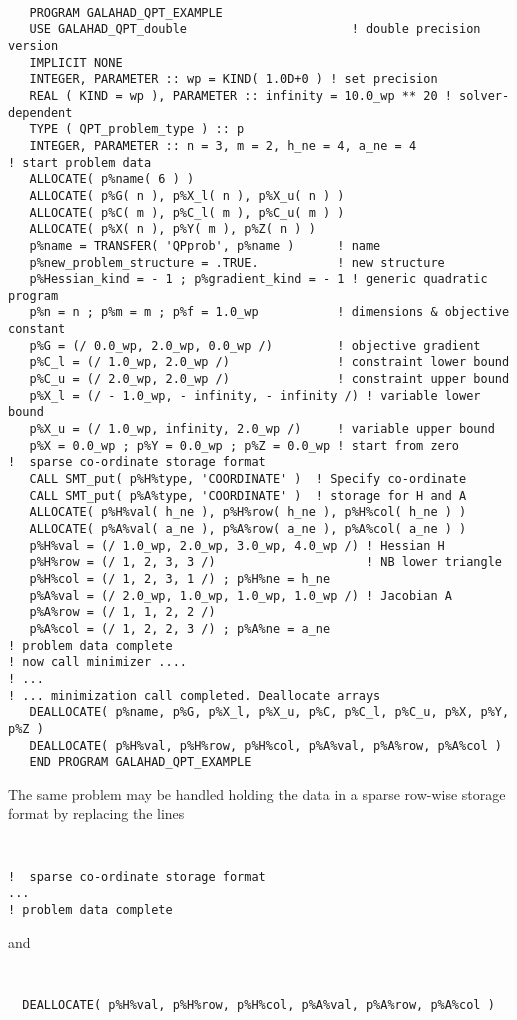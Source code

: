\documentclass{galahad}
\begin{document}
{\tt \small
\begin{verbatim}
   PROGRAM GALAHAD_QPT_EXAMPLE
   USE GALAHAD_QPT_double                       ! double precision version
   IMPLICIT NONE
   INTEGER, PARAMETER :: wp = KIND( 1.0D+0 ) ! set precision
   REAL ( KIND = wp ), PARAMETER :: infinity = 10.0_wp ** 20 ! solver-dependent
   TYPE ( QPT_problem_type ) :: p
   INTEGER, PARAMETER :: n = 3, m = 2, h_ne = 4, a_ne = 4
! start problem data
   ALLOCATE( p%name( 6 ) )
   ALLOCATE( p%G( n ), p%X_l( n ), p%X_u( n ) )
   ALLOCATE( p%C( m ), p%C_l( m ), p%C_u( m ) )
   ALLOCATE( p%X( n ), p%Y( m ), p%Z( n ) )
   p%name = TRANSFER( 'QPprob', p%name )      ! name
   p%new_problem_structure = .TRUE.           ! new structure
   p%Hessian_kind = - 1 ; p%gradient_kind = - 1 ! generic quadratic program
   p%n = n ; p%m = m ; p%f = 1.0_wp           ! dimensions & objective constant
   p%G = (/ 0.0_wp, 2.0_wp, 0.0_wp /)         ! objective gradient
   p%C_l = (/ 1.0_wp, 2.0_wp /)               ! constraint lower bound
   p%C_u = (/ 2.0_wp, 2.0_wp /)               ! constraint upper bound
   p%X_l = (/ - 1.0_wp, - infinity, - infinity /) ! variable lower bound
   p%X_u = (/ 1.0_wp, infinity, 2.0_wp /)     ! variable upper bound
   p%X = 0.0_wp ; p%Y = 0.0_wp ; p%Z = 0.0_wp ! start from zero
!  sparse co-ordinate storage format
   CALL SMT_put( p%H%type, 'COORDINATE' )  ! Specify co-ordinate
   CALL SMT_put( p%A%type, 'COORDINATE' )  ! storage for H and A
   ALLOCATE( p%H%val( h_ne ), p%H%row( h_ne ), p%H%col( h_ne ) )
   ALLOCATE( p%A%val( a_ne ), p%A%row( a_ne ), p%A%col( a_ne ) )
   p%H%val = (/ 1.0_wp, 2.0_wp, 3.0_wp, 4.0_wp /) ! Hessian H
   p%H%row = (/ 1, 2, 3, 3 /)                     ! NB lower triangle
   p%H%col = (/ 1, 2, 3, 1 /) ; p%H%ne = h_ne
   p%A%val = (/ 2.0_wp, 1.0_wp, 1.0_wp, 1.0_wp /) ! Jacobian A
   p%A%row = (/ 1, 1, 2, 2 /)
   p%A%col = (/ 1, 2, 2, 3 /) ; p%A%ne = a_ne
! problem data complete
! now call minimizer ....
! ...
! ... minimization call completed. Deallocate arrays
   DEALLOCATE( p%name, p%G, p%X_l, p%X_u, p%C, p%C_l, p%C_u, p%X, p%Y, p%Z )
   DEALLOCATE( p%H%val, p%H%row, p%H%col, p%A%val, p%A%row, p%A%col )
   END PROGRAM GALAHAD_QPT_EXAMPLE
\end{verbatim}
}
\noindent
The same problem may be handled holding the data in
a sparse row-wise storage format by replacing the lines
{\tt \small
\begin{verbatim}
!  sparse co-ordinate storage format
...
! problem data complete
\end{verbatim}
}
\noindent
and
{\tt \small
\begin{verbatim}
  DEALLOCATE( p%H%val, p%H%row, p%H%col, p%A%val, p%A%row, p%A%col )
\end{verbatim}
}
\end{document}
